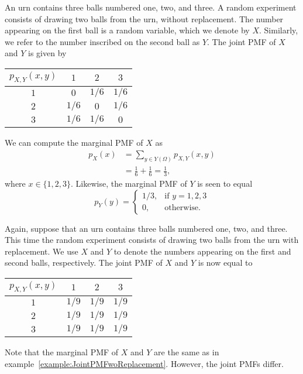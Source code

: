 \begin{example} \label{example:JointPMFwoReplacement}
An urn contains three balls numbered one, two, and three.
A random experiment consists of drawing two balls from the urn, without replacement.
The number appearing on the first ball is a random variable, which we denote by $X$.
Similarly, we refer to the number inscribed on the second ball as $Y$.
The joint PMF of $X$ and $Y$ is given by
\begin{center}
\begin{tabular}{|c|c|c|c|}
\hline
$p_{X,Y} (x,y)$ & $1$ & $2$ & $3$ \\
\hline
$1$ & $0$ & $1/6$ & $1/6$ \\
\hline
$2$ & $1/6$ & $0$ & $1/6$ \\
\hline
$3$ & $1/6$ & $1/6$ & $0$ \\
\hline
\end{tabular}
\end{center}
We can compute the marginal PMF of $X$ as
\begin{equation*}
\begin{split}
p_X (x) &= \sum_{y \in Y(\Omega)} p_{X,Y} (x,y) \\
&= \frac{1}{6} + \frac{1}{6} = \frac{1}{3},
\end{split}
\end{equation*}
where $x \in \{1, 2, 3 \}$.
Likewise, the marginal PMF of $Y$ is seen to equal
\begin{equation*}
p_Y (y) = \left\{ \begin{array}{ll}
1/3, & \text{if }y = 1, 2, 3 \\
0, & \text{otherwise} .
\end{array} \right.
\end{equation*}
\end{example}

\begin{example} \label{example:JointPMFwithReplacement}
Again, suppose that an urn contains three balls numbered one, two, and three.
This time the random experiment consists of drawing two balls from the urn with replacement.
We use $X$ and $Y$ to denote the numbers appearing on the first and second balls, respectively.
The joint PMF of $X$ and $Y$ is now equal to
\begin{center}
\begin{tabular}{|c|c|c|c|}
\hline
$p_{X,Y} (x,y)$ & $1$ & $2$ & $3$ \\
\hline
$1$ & $1/9$ & $1/9$ & $1/9$ \\
\hline
$2$ & $1/9$ & $1/9$ & $1/9$ \\
\hline
$3$ & $1/9$ & $1/9$ & $1/9$ \\
\hline
\end{tabular}
\end{center}
Note that the marginal PMF of $X$ and $Y$ are the same as in example~\ref{example:JointPMFwoReplacement}.
However, the joint PMFs differ.
\end{example}

